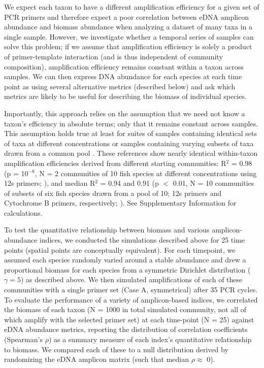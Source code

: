 \documentclass[fleqn,11pt,lineno]{wlscirep}
\begin{document}
We expect each taxon to have a different amplification efficiency for a given set of PCR primers and therefore expect a poor correlation between eDNA amplicon abundance and biomass abundance when analyzing a dataset of many taxa in a single sample. However, we investigate whether a temporal series of samples can solve this problem; if we assume that amplification efficiency is solely a product of primer-template interaction (and is thus independent of community composition), amplification efficiency remains constant within a taxon across samples. We can then express DNA abundance for each species at each time point as using several alternative metrics (described below) and ask which metrics are likely to be useful for describing the biomass of individual species. 

Importantly, this approach relies on the assumption that we need not know a taxon's efficiency in absolute terms; only that it remains constant across samples. This assumption holds true at least for suites of samples containing identical sets of taxa at different concentrations \cite{port2016assessing} or samples containing varying subsets of taxa drawn from a common pool \cite{hanfling2016environmental}. These references show nearly identical within-taxon amplification efficiencies derived from different starting communities: R$^2$ = 0.98 (p = 10$^{-8}$, N = 2 communities of 10 fish species at different concentrations using 12s primers; \cite{port2016assessing}), and median R$^2$ = 0.94 and 0.91 (p $<$ 0.01, N = 10 communities of subsets of six fish species drawn from a pool of 10; 12s primers and Cytochrome B primers, respectively; \cite{hanfling2016environmental}). See Supplementary Information for calculations. 

To test the quantitative relationship between biomass and various amplicon-abundance indices, we conducted the simulations described above for 25 time points (spatial points are conceptually equivalent). For each timepoint, we assumed each species randomly varied around a stable abundance and drew a proportional biomass for each species from a symmetric Dirichlet distribution ($\gamma = 5$) as described above.  We then simulated amplifications of each of these communities with a single primer set (Case A, symmetrical) after 35 PCR cycles. To evaluate the performance of a variety of amplicon-based indices, we correlated the biomass of each taxon (N = 1000 in total simulated community, not all of which amplify with the selected primer set) at each time-point (N = 25) against eDNA abundance metrics, reporting the distribution of correlation coefficients (Spearman's $\rho$) as a summary measure of each index's quantitative relationship to biomass. We compared each of these to a null distribution derived by randomizing the eDNA amplicon matrix (such that median $\rho \approx$ 0). 
\end{document}
